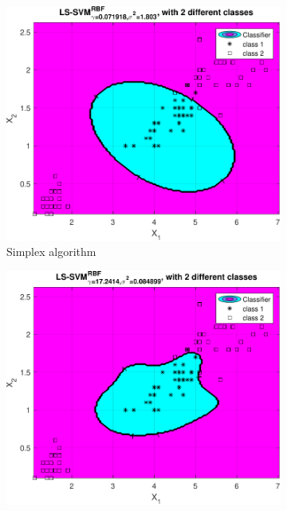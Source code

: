 \documentclass{article}
\begin{document}
            \begin{figure}[h]
                
                 \centering
                 \hspace{0.05\textwidth}
                 \begin{subfigure}[b]{0.4\textwidth}
                     \centering
                     \includegraphics[width=\textwidth]{Assignment 1/figures/rbf_simplex_optimal.pdf}
                    \caption{Simplex algorithm}
                     \label{fig:rbf_simplex_tuned}
                 \end{subfigure}
                 \hfill
                 \begin{subfigure}[b]{0.4\textwidth}
                     \centering
                     \includegraphics[width=\textwidth]{Assignment 1/figures/rbf_gridsearch_optimal.pdf}

\end{subfigure}
\end{figure}
\end{document}
